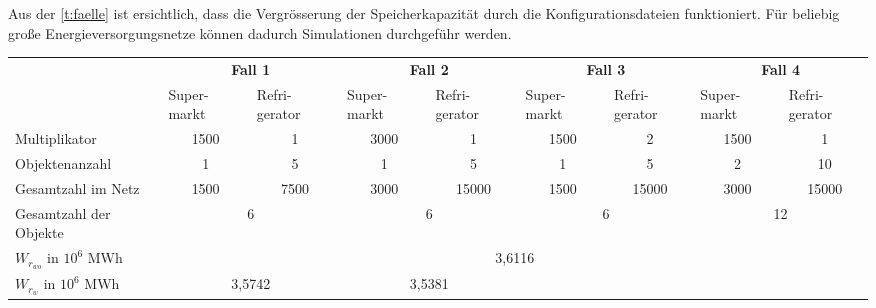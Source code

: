 Aus der \cref{t:faelle} ist ersichtlich, dass die Vergr\"osserung der
Speicherkapazit\"at durch die Konfigurationsdateien funktioniert. F\"ur beliebig
gro\ss e Energieversorgungsnetze k\"onnen dadurch Simulationen durchgef\"uhr
werden.

% 
\begin{table}
\footnotesize{
\centering
\begin{tabularx}{\textwidth}{X|X|X|X|X|X|X|X|X|}
\cline{2-9}
& \multicolumn{2}{c|}{\textbf{Fall 1}} & \multicolumn{2}{c|}{\textbf{Fall 2}}
&  \multicolumn{2}{c|}{\textbf{Fall 3}} &  \multicolumn{2}{c|}{\textbf{Fall 4}}\\
 \cline{2-9}
& Super- \linebreak markt & Refri- \linebreak gerator & Super- \linebreak markt
& Refri- \linebreak gerator & Super- \linebreak markt & Refri-\linebreak gerator
& Super- \linebreak markt & Refri-\linebreak gerator \\
\hline
\multicolumn{1}{|l|}{Multiplikator} & \multicolumn{1}{c|}{1500} &
\multicolumn{1}{c|}{1} & \multicolumn{1}{c|}{3000} & \multicolumn{1}{c|}{1} &
\multicolumn{1}{c|}{1500} & \multicolumn{1}{c|}{2} & \multicolumn{1}{c|}{1500} &
\multicolumn{1}{c|}{1} \\
\hline
\multicolumn{1}{|l|}{Objektenanzahl} & \multicolumn{1}{c|}{1} &
\multicolumn{1}{c|}{5}& \multicolumn{1}{c|}{1} & \multicolumn{1}{c|}{5} &
\multicolumn{1}{c|}{1}& \multicolumn{1}{c|}{5} & \multicolumn{1}{c|}{2}&
\multicolumn{1}{c|}{10} \\
\hline
\multicolumn{1}{|l|}{Gesamtzahl im Netz} & \multicolumn{1}{c|}{1500} &
\multicolumn{1}{c|}{7500}& \multicolumn{1}{c|}{3000} & \multicolumn{1}{c|}{15000} &
\multicolumn{1}{c|}{1500} & \multicolumn{1}{c|}{15000} & \multicolumn{1}{c|}{3000}&
\multicolumn{1}{c|}{15000} \\
\hline
\multicolumn{1}{|l|}{Gesamtzahl der Objekte} & \multicolumn{2}{c|}{6} &
\multicolumn{2}{c|}{6} & \multicolumn{2}{c|}{6} & \multicolumn{2}{c|}{12}\\
\hline
\hline
\multicolumn{1}{|l|}{$W_{r_{wo}}$ in $10^6$ MWh } & \multicolumn{8}{c|}{3,6116}\\
\hline
\multicolumn{1}{|l|}{$W_{r_{w}}$ in $10^6$ MWh} & \multicolumn{2}{c|}{3,5742} &
\multicolumn{2}{c|}{3,5381} &

\end{tabularx}}
\end{table}
